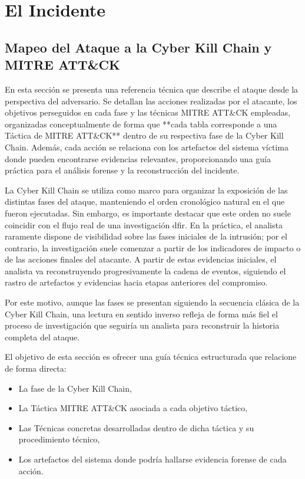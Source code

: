 \chapter{El Incidente}
\label{chap:incidente}

\section{Mapeo del Ataque a la Cyber Kill Chain y MITRE ATT\&CK}

En esta sección se presenta una referencia técnica que describe el ataque desde la perspectiva del adversario. Se detallan las acciones realizadas por el atacante, los objetivos perseguidos en cada fase y las técnicas MITRE ATT\&CK empleadas, organizadas conceptualmente de forma que **cada tabla corresponde a una Táctica de MITRE ATT\&CK** dentro de su respectiva fase de la Cyber Kill Chain. Además, cada acción se relaciona con los artefactos del sistema víctima donde pueden encontrarse evidencias relevantes, proporcionando una guía práctica para el análisis forense y la reconstrucción del incidente.

La Cyber Kill Chain se utiliza como marco para organizar la exposición de las distintas fases del ataque, manteniendo el orden cronológico natural en el que fueron ejecutadas. Sin embargo, es importante destacar que este orden no suele coincidir con el flujo real de una investigación \acrshort{dfir}. En la práctica, el analista raramente dispone de visibilidad sobre las fases iniciales de la intrusión; por el contrario, la investigación suele comenzar a partir de los indicadores de impacto o de las acciones finales del atacante. A partir de estas evidencias iniciales, el analista va reconstruyendo progresivamente la cadena de eventos, siguiendo el rastro de artefactos y evidencias hacia etapas anteriores del compromiso.

Por este motivo, aunque las fases se presentan siguiendo la secuencia clásica de la Cyber Kill Chain, una lectura en sentido inverso refleja de forma más fiel el proceso de investigación que seguiría un analista para reconstruir la historia completa del ataque.

El objetivo de esta sección es ofrecer una guía técnica estructurada que relacione de forma directa:
\begin{itemize}
    \item La fase de la Cyber Kill Chain,
    \item La Táctica MITRE ATT\&CK asociada a cada objetivo táctico,
    \item Las Técnicas concretas desarrolladas dentro de dicha táctica y su procedimiento técnico,
    \item Los artefactos del sistema donde podría hallarse evidencia forense de cada acción.
\end{itemize}

